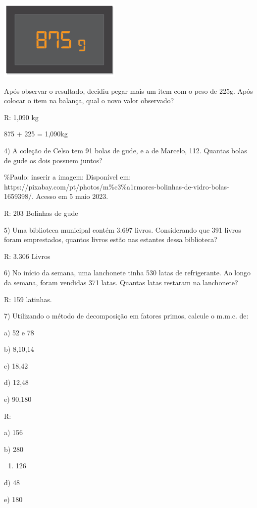 \includegraphics[width=2.33333in,height=1.53125in]{./imgSAEB_6_MAT/media/image23.png}

Após observar o resultado, decidiu pegar mais um item com o peso de
225g. Após colocar o item na balança, qual o novo valor observado?

R: 1,090 kg

875 + 225 = 1,090kg

4) A coleção de Celso tem 91 bolas de gude, e a de Marcelo, 112. Quantas
bolas de gude os dois possuem juntos?

\%Paulo: inserir a imagem: Disponível em:
https://pixabay.com/pt/photos/m\%c3\%a1rmores-bolinhas-de-vidro-bolas-1659398/.
Acesso em 5 maio 2023.

R: 203 Bolinhas de gude

5) Uma biblioteca municipal contém 3.697 livros. Considerando que 391
livros foram emprestados, quantos livros estão nas estantes dessa
biblioteca?

R: 3.306 Livros

6) No início da semana, uma lanchonete tinha 530 latas de refrigerante.
Ao longo da semana, foram vendidas 371 latas. Quantas latas restaram na
lanchonete?

R: 159 latinhas.

7) Utilizando o método de decomposição em fatores primos, calcule o
m.m.c. de:

a) 52 e 78

b) 8,10,14

c) 18,42

d) 12,48

e) 90,180

R:

a) 156

b) 280

\begin{enumerate}
\def\labelenumi{\alph{enumi})}
\setcounter{enumi}{2}
\tightlist
\item
  126
\end{enumerate}

d) 48

e) 180

